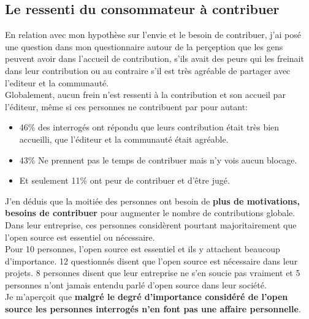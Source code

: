 		\subsection{Le ressenti du consommateur à contribuer}

			En relation avec mon hypothèse sur l'envie et le besoin de contribuer, j'ai posé une question dans mon questionnaire autour de la perçeption que les gens peuvent avoir dans l'accueil de contribution, s'ils avait des peurs qui les freinait dans leur contribution ou au contraire s'il est très agréable de partager avec l'editeur et la communauté.\\

			Globalement, aucun frein n'est ressenti à la contribution et son accueil par l'éditeur, même si ces personnes ne contribuent par pour autant:

			\begin{itemize}[label=\textbullet, font=\LARGE \color{burntorange}]
				\item 46\% des interrogés ont répondu que leurs contribution était très bien accueilli, que l'éditeur et la communauté était agréable.
				\item 43\% Ne prennent pas le temps de contribuer mais n'y vois aucun blocage.
				\item Et seulement 11\% ont peur de contribuer et d'être jugé.
			\end{itemize}

			J'en déduis que la moitiée des personnes ont besoin de \textbf{plus de motivations, besoins de contribuer} pour augmenter le nombre de contributions globale.\\

			Dans leur entreprise, ces personnes considèrent pourtant majoritairement que l'open source est essentiel ou nécessaire.\\

			Pour 10 personnes, l'open source est essentiel et ils y attachent beaucoup d'importance.
			12 questionnés disent que l'open source est nécessaire dans leur projets. 8 personnes disent que leur entreprise ne s'en soucie pas vraiment et 5 personnes n'ont jamais entendu parlé d'open source dans leur société.\\

			Je m'aperçoit que \textbf{malgré le degré d'importance considéré de l'open source les personnes interrogés n'en font pas une affaire personnelle}.


